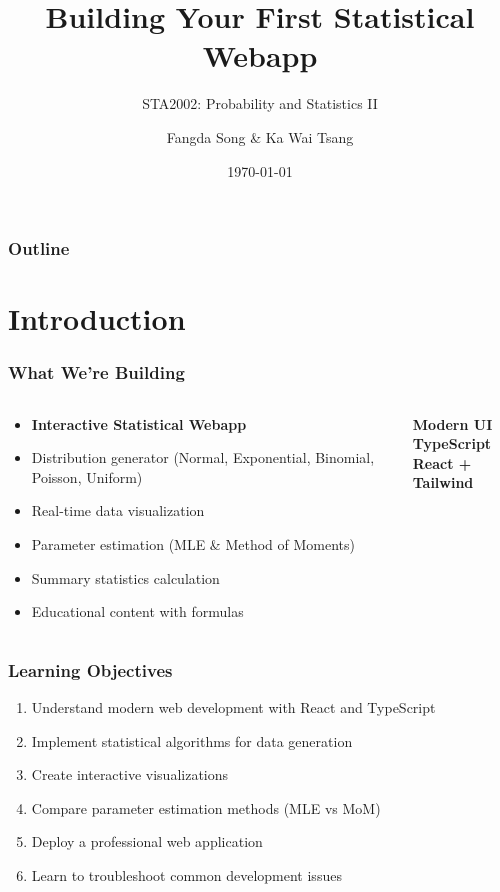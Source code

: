 \documentclass[aspectratio=169]{beamer}
\title[Statistical Webapp]{Building Your First Statistical Webapp}
\subtitle{STA2002: Probability and Statistics II}
\author{Fangda Song \& Ka Wai Tsang}
\institute[CUHK(SZ)]{School of Data Science, CUHK(SZ)}
\date{\today}
\begin{document}
\begin{frame}
\titlepage
\end{frame}

\begin{frame}
\frametitle{Outline}
\tableofcontents
\end{frame}

\section{Introduction}

\begin{frame}
\frametitle{What We're Building}
\begin{columns}
\begin{column}{0.6\textwidth}
\begin{itemize}
\item \textbf{Interactive Statistical Webapp}
\item Distribution generator (Normal, Exponential, Binomial, Poisson, Uniform)
\item Real-time data visualization
\item Parameter estimation (MLE \& Method of Moments)
\item Summary statistics calculation
\item Educational content with formulas
\end{itemize}
\end{column}
\begin{column}{0.4\textwidth}
\begin{center}
\textbf{Modern UI} \\
\textbf{TypeScript} \\
\textbf{React + Tailwind}
\end{center}
\end{column}
\end{columns}
\end{frame}

\begin{frame}
\frametitle{Learning Objectives}
\begin{enumerate}
\item Understand modern web development with React and TypeScript
\item Implement statistical algorithms for data generation
\item Create interactive visualizations
\item Compare parameter estimation methods (MLE vs MoM)
\item Deploy a professional web application
\item Learn to troubleshoot common development issues
\end{enumerate}
\end{frame}
\end{document}
